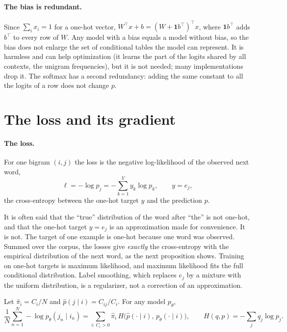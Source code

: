 \begin{notechapter}
\paragraph{The bias is redundant.} Since $\sum_ix_i = 1$ for a one-hot vector, $W^\top x + b = (W + \mathbf 1b^\top)^\top x$, where
$\mathbf 1b^\top$ adds $b^\top$ to every row of $W$. Any model with a bias equals a model without bias, so the bias does not
enlarge the set of conditional tables the model can represent. It is harmless and can
help optimization (it learns the part of the logits shared by all contexts, the unigram
frequencies), but it is not needed; many implementations drop it. The softmax has a second
redundancy: adding the same constant to all the logits of a row does not change $p$.

\section{The loss and its gradient}\label{bigram-models:sec:gradient}

\paragraph{The loss.} For one bigram $(i, j)$ the loss is the negative log-likelihood of the observed
next word,
\[
  \ell = -\log p_j = -\sum_{k=1}^Vy_k\log p_k,\qquad y = e_j,
\]
the cross-entropy between the one-hot target $y$ and the prediction $p$.

\begin{pitfall}
It is often said that the ``true'' distribution of the word after ``the'' is not one-hot,
and that the one-hot target $y = e_j$ is an approximation made for convenience. It is not. The
target of one example is one-hot because one word was observed. Summed over the corpus,
the losses give \emph{exactly} the cross-entropy with the empirical distribution of the next word,
as the next proposition shows. Training on one-hot targets is maximum likelihood, and
maximum likelihood fits the full conditional distribution. Label smoothing, which replaces
$e_j$ by a mixture with the uniform distribution, is a regularizer, not a correction of an
approximation.
\end{pitfall}

\begin{proposition}\label{bigram-models:prop:empirical}
Let $\hat\pi_i = C_i/N$ and $\hat p(j\mid i) = C_{ij}/C_i$. For any model $p_\theta$,
\[
  \frac1N\sum_{n=1}^N-\log p_\theta(j_n\mid i_n) = \sum_{i:\,C_i>0}\hat\pi_i\,H\bigl(\hat p(\cdot\mid i),\,p_\theta(\cdot\mid i)\bigr),\qquad
  H(q, p) = -\sum_jq_j\log p_j .
\]
\end{proposition}


\end{notechapter}
